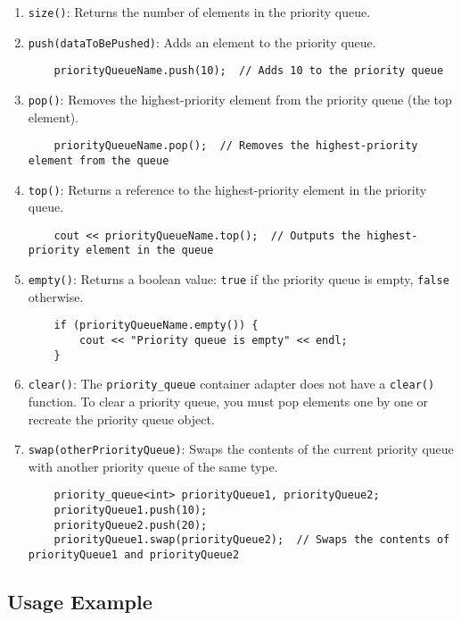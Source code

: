 \documentclass{article}
\begin{document}
\begin{enumerate}
    \item \texttt{size()}: Returns the number of elements in the priority queue.
    \item \texttt{push(dataToBePushed)}: Adds an element to the priority queue.
    \begin{lstlisting}
    priorityQueueName.push(10);  // Adds 10 to the priority queue
    \end{lstlisting}
    \item \texttt{pop()}: Removes the highest-priority element from the priority queue (the top element).
    \begin{lstlisting}
    priorityQueueName.pop();  // Removes the highest-priority element from the queue
    \end{lstlisting}
    \item \texttt{top()}: Returns a reference to the highest-priority element in the priority queue.
    \begin{lstlisting}
    cout << priorityQueueName.top();  // Outputs the highest-priority element in the queue
    \end{lstlisting}
    \item \texttt{empty()}: Returns a boolean value: \texttt{true} if the priority queue is empty, \texttt{false} otherwise.
    \begin{lstlisting}
    if (priorityQueueName.empty()) {
        cout << "Priority queue is empty" << endl;
    }
    \end{lstlisting}
    \item \texttt{clear()}: The \texttt{priority\_queue} container adapter does not have a \texttt{clear()} function. To clear a priority queue, you must pop elements one by one or recreate the priority queue object.
    \item \texttt{swap(otherPriorityQueue)}: Swaps the contents of the current priority queue with another priority queue of the same type.
    \begin{lstlisting}
    priority_queue<int> priorityQueue1, priorityQueue2;
    priorityQueue1.push(10);
    priorityQueue2.push(20);
    priorityQueue1.swap(priorityQueue2);  // Swaps the contents of priorityQueue1 and priorityQueue2
    \end{lstlisting}
\end{enumerate}

\subsection{Usage Example}
\end{document}
